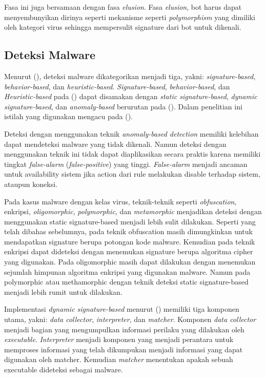 Fasa ini juga bersamaan dengan fasa \textit{elusion}. Fasa \textit{elusion}, bot harus dapat menyembunyikan dirinya seperti mekanisme seperti \textit{polymorphism} yang dimiliki oleh kategori virus sehingga mempersulit signature dari bot untuk dikenali. 

\subsection{Deteksi Malware}

Menurut (\cite{6620049}), deteksi malware dikategorikan menjadi tiga, yakni: \textit{signature-based}, \textit{behavior-based}, dan \textit{heuristic-based}. \textit{Signature-based}, \textit{behavior-based}, dan \textit{Heuristic-based} pada (\cite{6620049}) dapat disamakan dengan \textit{static signature-based}, \textit{dynamic signature-based}, dan \textit{anomaly-based} berurutan pada (\cite{idika2007survey}). Dalam penelitian ini istilah yang digunakan mengacu pada (\cite{idika2007survey}).

Deteksi dengan menggunakan teknik \textit{anomaly-based detection} memiliki kelebihan dapat mendeteksi malware yang tidak dikenali. Namun deteksi dengan menggunakan teknik ini tidak dapat diaplikasikan secara praktis karena memiliki tingkat \textit{false-alarm} (\textit{false-positive}) yang tinggi. \textit{False-alarm} menjadi ancaman untuk availability sistem jika action dari rule melakukan disable terhadap sistem, ataupun koneksi.

Pada kasus malware dengan kelas virus, teknik-teknik seperti \textit{obfuscation}, enkripsi, \textit{oligomorphic}, \textit{polymorphic}, dan \textit{metamorphic} menjadikan deteksi dengan menggunakan static signature-based menjadi lebih sulit dilakukan. Seperti yang telah dibahas sebelumnya, pada teknik obfuscation masih dimungkinkan untuk mendapatkan signature berupa potongan kode malware. Kemudian pada teknik enkripsi dapat dideteksi dengan menemukan signature berupa algoritma cipher yang digunakan. Pada oligomorphic masih dapat dilakukan dengan menemukan sejumlah himpunan algoritma enkripsi yang digunakan malware. Namun pada polymorphic atau methamorphic dengan teknik deteksi static signature-based menjadi lebih rumit untuk dilakukan.

Implementasi \textit{dynamic signature-based} menurut (\cite{6620049}) memiliki tiga komponen utama, yakni: \textit{data collector}, \textit{interpreter}, dan \textit{matcher}. Komponen \textit{data collector} menjadi bagian yang mengumpulkan informasi perilaku yang dilakukan oleh \textit{executable}. \textit{Interpreter} menjadi komponen yang menjadi perantara untuk memproses informasi yang telah dikumpukan menjadi informasi yang dapat digunakan oleh matcher. Kemudian \textit{matcher} menentukan apakah sebuah executable dideteksi sebagai malware.

